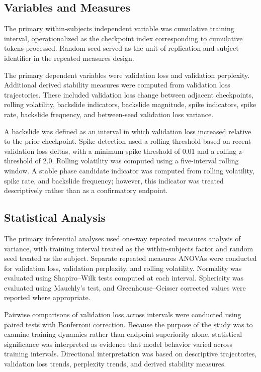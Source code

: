 \documentclass{article}
\begin{document}
\subsection{Variables and Measures}

The primary within-subjects independent variable was cumulative training interval, operationalized as the checkpoint index corresponding to cumulative tokens processed. Random seed served as the unit of replication and subject identifier in the repeated measures design.

The primary dependent variables were validation loss and validation perplexity. Additional derived stability measures were computed from validation loss trajectories. These included validation loss change between adjacent checkpoints, rolling volatility, backslide indicators, backslide magnitude, spike indicators, spike rate, backslide frequency, and between-seed validation loss variance.

A backslide was defined as an interval in which validation loss increased relative to the prior checkpoint. Spike detection used a rolling threshold based on recent validation loss deltas, with a minimum spike threshold of 0.01 and a rolling z-threshold of 2.0. Rolling volatility was computed using a five-interval rolling window. A stable phase candidate indicator was computed from rolling volatility, spike rate, and backslide frequency; however, this indicator was treated descriptively rather than as a confirmatory endpoint.

\subsection{Statistical Analysis}

The primary inferential analyses used one-way repeated measures analysis of variance, with training interval treated as the within-subjects factor and random seed treated as the subject. Separate repeated measures ANOVAs were conducted for validation loss, validation perplexity, and rolling volatility. Normality was evaluated using Shapiro--Wilk tests computed at each interval. Sphericity was evaluated using Mauchly's test, and Greenhouse--Geisser corrected values were reported where appropriate.

Pairwise comparisons of validation loss across intervals were conducted using paired tests with Bonferroni correction. Because the purpose of the study was to examine training dynamics rather than endpoint superiority alone, statistical significance was interpreted as evidence that model behavior varied across training intervals. Directional interpretation was based on descriptive trajectories, validation loss trends, perplexity trends, and derived stability measures.
\end{document}
